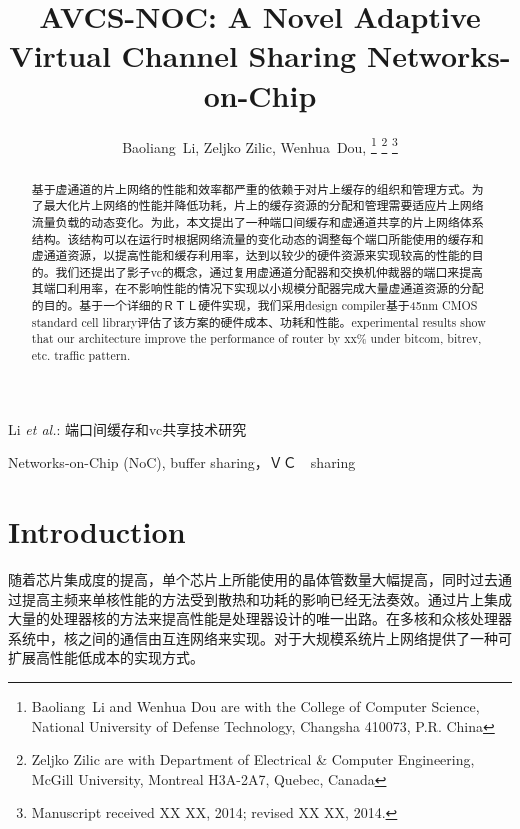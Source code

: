﻿\documentclass[10pt,journal]{IEEEtran}
\begin{document}
\title{AVCS-NOC: A Novel Adaptive Virtual Channel Sharing Networks-on-Chip}
\author{Baoliang~Li, %
        Zeljko Zilic, %
        Wenhua~Dou, %
\thanks{Baoliang~Li and Wenhua Dou are with the College of Computer Science, National University of Defense Technology, Changsha 410073, P.R. China}%
\thanks{Zeljko Zilic are with Department of Electrical \& Computer Engineering, McGill University, Montreal H3A-2A7, Quebec, Canada}%
\thanks{Manuscript received XX XX, 2014; revised XX XX, 2014.}}

%
{Li \MakeLowercase{\textit{et al.}}: 端口间缓存和vc共享技术研究}

\maketitle

\begin{abstract}
基于虚通道的片上网络的性能和效率都严重的依赖于对片上缓存的组织和管理方式。为了最大化片上网络的性能并降低功耗，片上的缓存资源的分配和管理需要适应片上网络流量负载的动态变化。为此，本文提出了一种端口间缓存和虚通道共享的片上网络体系结构。该结构可以在运行时根据网络流量的变化动态的调整每个端口所能使用的缓存和虚通道资源，以提高性能和缓存利用率，达到以较少的硬件资源来实现较高的性能的目的。我们还提出了影子vc的概念，通过复用虚通道分配器和交换机仲裁器的端口来提高其端口利用率，在不影响性能的情况下实现以小规模分配器完成大量虚通道资源的分配的目的。基于一个详细的ＲＴＬ硬件实现，我们采用design compiler基于45nm CMOS standard cell library评估了该方案的硬件成本、功耗和性能。experimental results show that our architecture improve the performance of router by xx\% under bitcom, bitrev, etc. traffic pattern. 

\end{abstract}
\begin{IEEEkeywords}
Networks-on-Chip (NoC), buffer sharing，ＶＣ　sharing
\end{IEEEkeywords}

\section{Introduction}
随着芯片集成度的提高，单个芯片上所能使用的晶体管数量大幅提高，同时过去通过提高主频来单核性能的方法受到散热和功耗的影响已经无法奏效。通过片上集成大量的处理器核的方法来提高性能是处理器设计的唯一出路。在多核和众核处理器系统中，核之间的通信由互连网络来实现。对于大规模系统片上网络提供了一种可扩展高性能低成本的实现方式。
\end{document}
